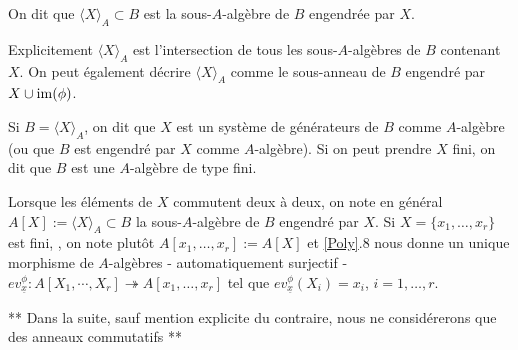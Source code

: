 \begin{definition}
    On dit que $\langle X\rangle_A\subset B$ est la sous-$A$-algèbre de $B$
    engendrée par $X$.
\end{definition}

Explicitement $\langle X\rangle_A$ est l'intersection de tous les
sous-$A$-algèbres de $B$ contenant $X$. On peut également décrire $\langle
X\rangle_A$ comme  le sous-anneau de $B$ engendré par $X\cup\operatorname{im}(\phi)$.

\begin{definition}
    Si $B=\langle X\rangle_A$, on dit que $X$ est un système de générateurs de
    $B$ comme $A$-algèbre (ou que $B$ est engendré par $X$ comme $A$-algèbre).
    Si on peut prendre $X$ fini, on dit que $B$ est une $A$-algèbre de type
    fini.
\end{definition}

Lorsque les éléments de $X$ commutent deux à deux, on note en général
$A[X]:=\langle X\rangle_A \subset B$ la sous-$A$-algèbre de $B$ engendré par
$X$. Si  $X=\lbrace x_1,\dots,x_r\rbrace $ est fini, , on note plutôt
$A[x_1,\dots,x_r]:=A[X]$ et  \ref{Poly}.8  nous donne un unique morphisme de
$A$-algèbres - automatiquement  surjectif -
$ev_{\underline{x}}^\phi:A[X_1,\cdots, X_r]\twoheadrightarrow A[x_1,\dots, x_r]
$ tel que $ev^\phi_{\underline{x}}(X_i)=x_i$, $i=1,\dots, r$. \\

\begin{center}
    **  Dans la suite,  sauf mention explicite du contraire, nous ne
    considérerons que des anneaux commutatifs **
\end{center}
